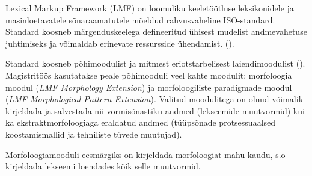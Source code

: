 \documentclass[12pt,a4paper]{article}
\begin{document}

Lexical Markup Framework (LMF) on loomuliku keeletöötluse leksikonidele ja masin\-loetavatele sõna\-raamatutele mõeldud rahvusvaheline ISO-standard. Standard koosneb märgenduskeelega defineeritud ühisest mudelist andmevahetuse juhtimiseks ja võimaldab erinevate ressursside ühendamist. (\cite[1]{francopoulo_lmf_2013}).

Standard koosneb põhimoodulist ja mitmest eri\-otstarbelisest laiendi\-moodulist (\cite[22]{francopoulo_lmf_2013}). Magistritöös kasutatakse peale põhimooduli veel kahte moodulit: morfoloogia moodul (\textit{LMF Morphology Extension}) ja morfoloogiliste paradigmade moodul (\textit{LMF Morphological Pattern Extension}). Valitud moodulitega on olnud võimalik kirjeldada ja salvestada nii vormisõnastiku andmed (lekseemide muutvormid) kui ka ekstrakt\-morfoloogiaga eraldatud andmed (tüüpsõnade protsessuaalsed koostamis\-mallid ja tehniliste tüvede muutujad).

Morfoloogiamooduli eesmärgiks on kirjeldada morfoloogiat mahu kaudu, s.o kirjeldada lekseemi loendades kõik selle muutvormid.
\end{document}
